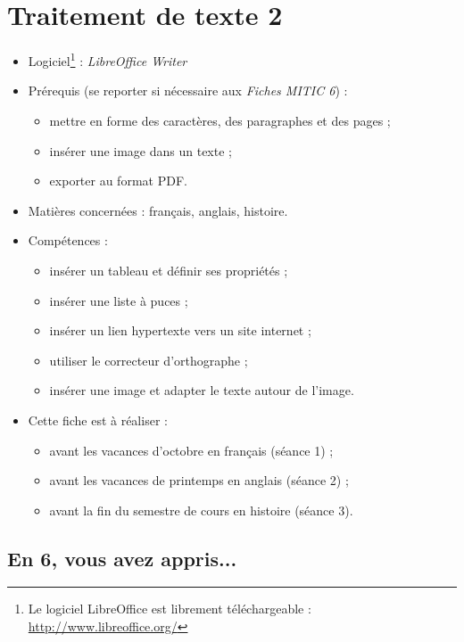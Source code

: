 \chapter{Traitement de texte 2}  


{\footnotesize
\begin{itemize}
\item Logiciel\footnote{Le logiciel LibreOffice est librement téléchargeable : \url{http://www.libreoffice.org/}} : \emph{LibreOffice Writer} 
\item Prérequis (se reporter si nécessaire aux \emph{Fiches MITIC 6}) : 
        \begin{itemize}
        \item mettre en forme des caractères, des paragraphes et des pages ;
        \item insérer une image dans un texte ;
        \item exporter au format PDF.
        \end{itemize}
\item Matières concernées : français, anglais, histoire.
\item Compétences : 
        \begin{itemize}
        \item insérer un tableau et définir ses propriétés ;
        \item insérer une liste à puces ;
        \item insérer un lien hypertexte vers un site internet ;
        \item utiliser le correcteur d'orthographe ;
        \item insérer une image et adapter le texte autour de l'image.
        \end{itemize}
\item Cette fiche est à réaliser :
        \begin{itemize}
        \item avant les vacances d'octobre en français (séance 1) ;
        \item avant les vacances de printemps en anglais (séance 2) ;
        \item avant la fin du semestre de cours en histoire (séance 3). 
        \end{itemize}
\end{itemize}
}%




\section*{En 6, vous avez appris...}

